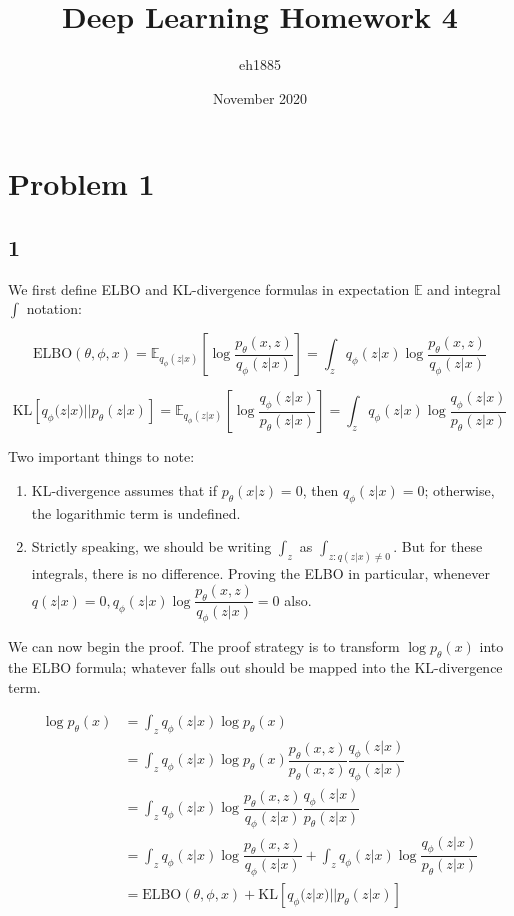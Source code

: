 \documentclass{article}
\title{Deep Learning Homework 4}
\author{eh1885 }
\date{November 2020}
\begin{document}
\maketitle

\section{Problem 1}
\subsection{1}
We first define ELBO and KL-divergence formulas in expectation $\mathbb{E}$ and integral $\int$ notation:

$$
\text{ELBO}(\theta, \phi, x) 
= \mathbb{E}_{q_\phi(z|x)}[\log \dfrac{p_\theta(x,z)}{q_\phi(z|x)}]
= \int_{z} q_\phi(z|x) \log \dfrac{p_\theta(x,z)}{q_\phi(z|x)}
$$

$$
\text{KL}[q_\phi(z|x) || p_\theta(z|x)]
= \mathbb{E}_{q_\phi(z|x)}[\log \dfrac{q_\phi(z|x)}{p_\theta(z|x)}] 
= \int_{z} q_\phi(z|x) \log \dfrac{q_\phi(z|x)}{p_\theta(z|x)}
$$

Two important things to note: 

\begin{enumerate}
    \item KL-divergence assumes that if $p_\theta(x|z) = 0$, then $q_\phi(z|x) = 0$; otherwise, the logarithmic term is undefined.
    \item Strictly speaking, we should be writing $\int_{z}$ as $\int_{z:q(z|x) \neq 0}$. But for these integrals, there is no difference. Proving the ELBO in particular, whenever $q(z|x) = 0, q_\phi(z|x) \log \dfrac{p_\theta(x,z)}{q_\phi(z|x)} = 0$ also.
\end{enumerate}

We can now begin the proof. The proof strategy is to transform $\log p_\theta (x)$ into the ELBO formula; whatever falls out should be mapped into the KL-divergence term.

\begin{align}
    \log p_\theta (x) &= \int_{z} q_\phi (z|x) \log p_\theta(x) \\
    &= \int_{z} q_\phi (z|x) \log p_\theta(x) \dfrac{p_\theta(x,z)}{p_\theta(x,z)} \dfrac{q_\phi(z|x)}{q_\phi(z|x)} \\
    &= \int_{z} q_\phi (z|x) \log \dfrac{p_\theta(x,z)}{q_\phi(z|x)} \dfrac{q_\phi(z|x)}{p_\theta(z|x)} \\
    &= \int_{z} q_\phi (z|x) \log \dfrac{p_\theta(x,z)}{q_\phi(z|x)} + \int_{z} q_\phi (z|x) \log \dfrac{q_\phi(z|x)}{p_\theta(z|x)} \\ 
    &= \text{ELBO}(\theta, \phi, x) + \text{KL}[q_\phi(z|x) || p_\theta(z|x)]
\end{align}
\end{document}
